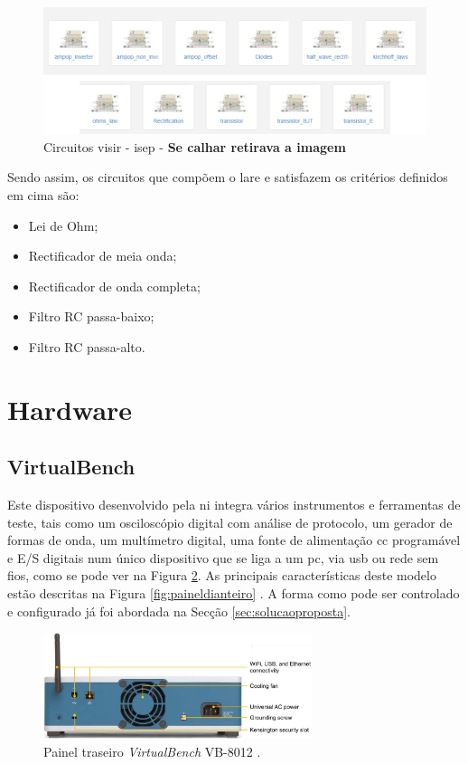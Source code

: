 \begin{figure}[hbtp]
    \centering
    \includegraphics[width=1\textwidth]{figures/visir_ISEP.png}
    \caption{Circuitos \acrshort{visir} - \acrshort{isep} - \textbf{Se calhar retirava a imagem}}
    \label{fig:circuitosvisir}
\end{figure}

Sendo assim, os circuitos que compõem o \acrshort{lare} e satisfazem os critérios definidos em cima são:
\begin{itemize}
    \item Lei de Ohm;
    \item Rectificador de meia onda;
    \item Rectificador de onda completa;
    \item Filtro RC passa-baixo;
    \item Filtro RC passa-alto.
\end{itemize}

\section{Hardware}
\label{sec:hardware}
\subsection{VirtualBench}
Este dispositivo desenvolvido pela \acrshort{ni} integra vários instrumentos e ferramentas de teste, tais como um osciloscópio digital com análise de protocolo, um gerador de formas de onda, um multímetro digital, uma fonte de alimentação \acrfull{cc} programável e E/S digitais num único dispositivo que se liga a um \acrshort{pc}, via \acrshort{usb} ou rede sem fios, como se pode ver na Figura \ref{fig:paineltraseiro}. As principais características deste modelo estão descritas na Figura \ref{fig:paineldianteiro} \cite{datasheetVirtualBench}. A forma como pode ser controlado e configurado já foi abordada na Secção \ref{sec:solucaoproposta}.

\begin{figure}[hbtp]
    \centering
    \centering
    \includegraphics[width=0.7\textwidth]{figures/virtualbench_back-panel.jpg}
    \caption{Painel traseiro \textit{VirtualBench} VB-8012  \cite{datasheetVirtualBench}.}
    \label{fig:paineltraseiro}
\end{figure}


